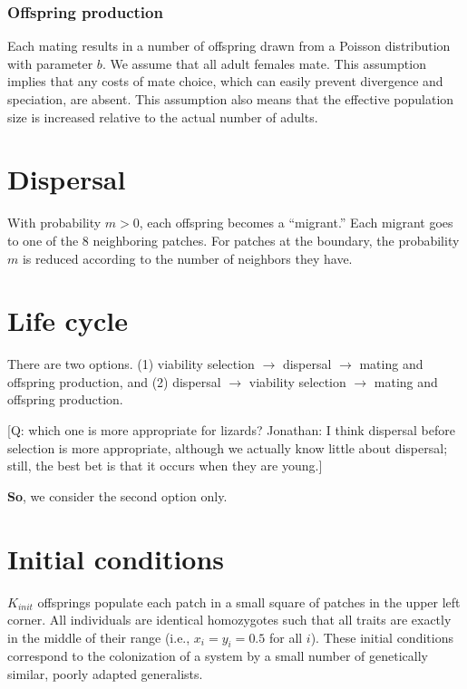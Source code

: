 \documentclass{article}
\begin{document}
\subsubsection{Offspring production}

Each mating results in a number of offspring drawn from a Poisson distribution with parameter $b$.
We assume that all adult females mate. This assumption implies that any costs of mate choice,
which can easily prevent divergence and speciation, are absent.
This assumption also means that the effective population size is increased relative to the actual
number of adults. 
\section{Dispersal}


With probability $m>0$, each offspring becomes a ``migrant.''
Each migrant goes to one of the 8 neighboring patches.
For patches at the boundary, the probability $m$ is reduced according 
to the number of neighbors they have.


\section{Life cycle}

There are two options. (1) viability selection $\rightarrow$ dispersal
$\rightarrow$ mating and offspring production, and (2) dispersal
$\rightarrow$ viability selection $\rightarrow$ mating and offspring production.

{\footnotesize [Q: which one is more appropriate for lizards? Jonathan:
I think dispersal before selection is more appropriate, although we actually know little about dispersal; still, the best bet is that it occurs when they are young.]}

{\bf So}, we consider the second option only.


\section{Initial conditions}

$K_{init}$ offsprings populate each patch in a small square of patches in the upper left corner.
All individuals are identical homozygotes such that all traits are exactly in the
middle of their range (i.e., $x_i=y_i=0.5$ for all $i$).
These initial conditions correspond to the colonization of a system by a small number of
genetically similar, poorly adapted generalists.
\end{document}
